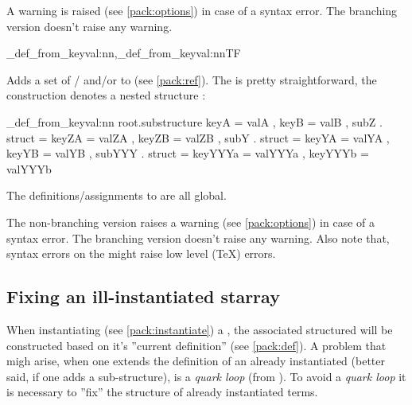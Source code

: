 \documentclass[10pt]{article}
\begin{document}
\begin{tsremark}[Note 2:]
A warning is raised (see \ref{pack:options}) in case of a  syntax error. The branching version doesn't raise any warning.
\end{tsremark}

\begin{codedescribe}{\starray_def_from_keyval:nn,\starray_def_from_keyval:nnTF}
\begin{codesyntax}%
\end{codesyntax}

Adds a set of  /  and/or  to  (see \ref{pack:ref}). The  is pretty straightforward, 
the construction  denotes a nested structure :
\end{codedescribe}

\begin{codestore}
\starray_def_from_keyval:nn {root.substructure} 
  {
    keyA = valA ,
    keyB = valB ,
    subZ . struct = 
      {
        keyZA = valZA ,
        keyZB = valZB ,
      }
    subY . struct =
      {
        keyYA = valYA ,
        keyYB = valYB ,
        subYYY . struct =
          {
            keyYYYa = valYYYa ,
            keyYYYb = valYYYb 
          }
      }
  }
\end{codestore}


The definitions/assignments  to  are all global.

\begin{tsremark}
The non-branching version raises a warning (see \ref{pack:options}) in case of a  syntax error. The branching version doesn't raise any warning. Also note that, syntax errors on the  might raise low level (\TeX) errors.
\end{tsremark}

\subsection{Fixing an ill-instantiated starray}\label{pack:def-fix}

When instantiating (see \ref{pack:instantiate}) a , the associated structured will be constructed based on it's ''current definition'' (see \ref{pack:def}). A problem that migh arise, when one extends the definition of an already instantiated   (better said, if one adds a sub-structure), is a \textsl{quark loop} (from ). To avoid a \textsl{quark loop} it is necessary to ''fix'' the structure of already instantiated terms.
\end{document}
